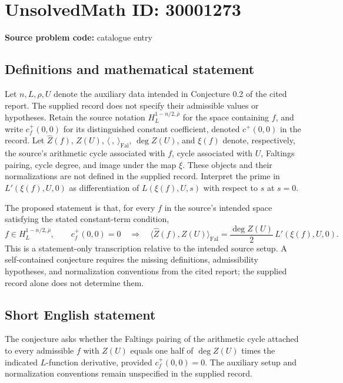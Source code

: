 \documentclass[11pt]{article}
\begin{document}
\section*{UnsolvedMath ID: 30001273}
\textbf{Source problem code:} catalogue entry
\subsection{Definitions and mathematical statement}
Let \(n,L,\rho,U\) denote the auxiliary data intended in Conjecture 0.2 of the cited report. The supplied record does not specify their admissible values or hypotheses. Retain the source notation \(H_L^{1-n/2,\bar\rho}\) for the space containing \(f\), and write \(c_f^+(0,0)\) for its distinguished constant coefficient, denoted \(c^+(0,0)\) in the record. Let \(\widehat Z(f)\), \(Z(U)\), \(\langle\ ,\ \rangle_{\mathrm{Fal}}\), \(\deg Z(U)\), and \(\xi(f)\) denote, respectively, the source's arithmetic cycle associated with \(f\), cycle associated with \(U\), Faltings pairing, cycle degree, and image under the map \(\xi\). These objects and their normalizations are not defined in the supplied record. Interpret the prime in \(L'(\xi(f),U,0)\) as differentiation of \(L(\xi(f),U,s)\) with respect to \(s\) at \(s=0\).

The proposed statement is that, for every \(f\) in the source's intended space satisfying the stated constant-term condition,
\[
 f\in H_L^{1-n/2,\bar\rho},\qquad c_f^+(0,0)=0
 \quad\Longrightarrow\quad
 \bigl\langle\widehat Z(f),Z(U)\bigr\rangle_{\mathrm{Fal}}
 =\frac{\deg Z(U)}{2}\,L'(\xi(f),U,0).
\]
This is a statement-only transcription relative to the intended source setup. A self-contained conjecture requires the missing definitions, admissibility hypotheses, and normalization conventions from the cited report; the supplied record alone does not determine them.
\subsection{Short English statement}
The conjecture asks whether the Faltings pairing of the arithmetic cycle attached to every admissible \(f\) with \(Z(U)\) equals one half of \(\deg Z(U)\) times the indicated \(L\)-function derivative, provided \(c_f^+(0,0)=0\). The auxiliary setup and normalization conventions remain unspecified in the supplied record.
\end{document}
